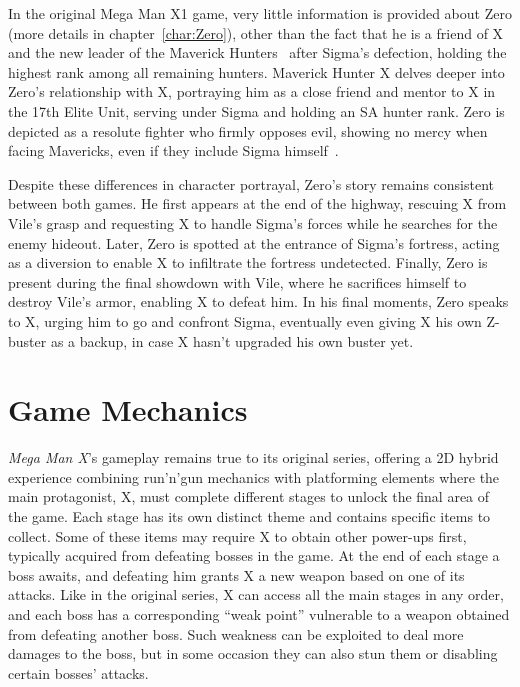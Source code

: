 In the original Mega Man X1 game, very little information is provided about Zero (more details in chapter~\ref{char:Zero}), other than the fact that he is a friend of X and the new leader of the Maverick Hunters~\cite{X:Manual} after Sigma's defection, holding the highest rank among all remaining hunters. Maverick Hunter X delves deeper into Zero's relationship with X, portraying him as a close friend and mentor to X in the 17th Elite Unit, serving under Sigma and holding an SA hunter rank. Zero is depicted as a resolute fighter who firmly opposes evil, showing no mercy when facing Mavericks, even if they include Sigma himself~\cite{Xcoll1:Manual_X1}.

Despite these differences in character portrayal, Zero's story remains consistent between both games. He first appears at the end of the highway, rescuing X from Vile's grasp and requesting X to handle Sigma's forces while he searches for the enemy hideout. Later, Zero is spotted at the entrance of Sigma's fortress, acting as a diversion to enable X to infiltrate the fortress undetected. Finally, Zero is present during the final showdown with Vile, where he sacrifices himself to destroy Vile's armor, enabling X to defeat him. In his final moments, Zero speaks to X, urging him to go and confront Sigma, eventually even giving X his own Z-buster as a backup, in case X hasn't upgraded his own buster yet.

\section{Game Mechanics}
\textit{Mega Man X}'s gameplay remains true to its original series, offering a 2D hybrid experience combining run'n'gun mechanics with platforming elements where the main protagonist, X, must complete different stages to unlock the final area of the game. Each stage has its own distinct theme and contains specific items to collect. Some of these items may require X to obtain other power-ups first, typically acquired from defeating bosses in the game. At the end of each stage a boss awaits, and defeating him grants X a new weapon based on one of its attacks. Like in the original series, X can access all the main stages in any order, and each boss has a corresponding ``weak point'' vulnerable to a weapon obtained from defeating another boss. Such weakness can be exploited to deal more damages to the boss, but in some occasion they can also stun them or disabling certain bosses' attacks.

